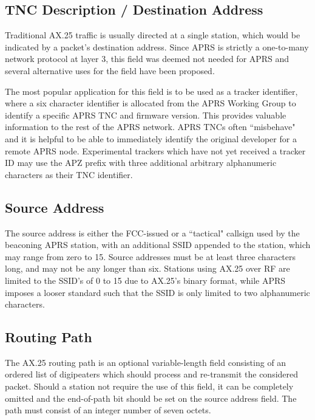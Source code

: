 \subsection{TNC Description / Destination Address}

Traditional AX.25 traffic is usually directed at a single station, which would be indicated by 
a packet's destination address. 
Since APRS is strictly a one-to-many network protocol at layer 3, this field
was deemed not needed for APRS and several alternative uses for the field have been proposed.

The most popular application for this field is to be used as a tracker identifier, where a
six character identifier is allocated from the APRS Working Group to identify a specific 
APRS TNC and firmware version. 
This provides valuable information to the rest of the APRS network.
APRS
TNCs often ``misbehave" and it is helpful to be able to immediately identify the original
developer for a remote APRS node. 
Experimental trackers which have not yet received a tracker ID may use the 
APZ prefix with three additional arbitrary alphanumeric characters as their TNC identifier.

\subsection{Source Address}

The source address is either the FCC-issued or a ``tactical" callsign used by 
the beaconing APRS station, with an 
additional SSID appended to the station, which may range from zero to 15. Source addresses must 
be at least three characters long, and may not be any longer than six. Stations using AX.25 
over RF are limited to the SSID's of 0 to 15 due to AX.25's binary format, 
while APRS imposes a looser standard such that the SSID is only limited to 
two alphanumeric characters.

\subsection{Routing Path}
\label{subsec:ax25RoutingPath}

The AX.25 routing path is an optional variable-length field consisting of an ordered list of
digipeaters which should process and re-transmit the considered packet. Should a station not
require the use of this field, it can be completely omitted and the end-of-path bit should be
set on the source address field. The path must consist of an integer number of seven octets.

